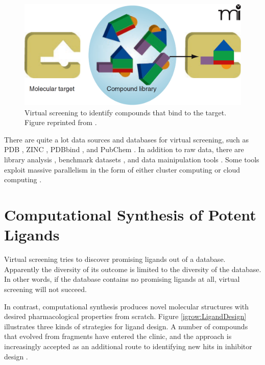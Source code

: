 \begin{figure}
\centering
\includegraphics[width=\textwidth]{Background/VirtualScreening.png}
\caption{Virtual screening to identify compounds that bind to the target. Figure reprinted from \citep{470}.}
\label{Background:VirtualScreening}
\end{figure}

There are quite a lot data sources and databases for virtual screening, such as PDB \citep{540,539,537,105,538}, ZINC \citep{532}, PDBbind \citep{529,530}, and PubChem \citep{526}. In addition to raw data, there are library analysis \citep{521}, benchmark datasets \citep{534,533,535,536}, and data mainipulation tools \citep{542}. Some tools exploit massive parallelism in the form of either cluster computing or cloud computing \citep{557,773,560,782}.

\section{Computational Synthesis of Potent Ligands}

Virtual screening tries to discover promising ligands out of a database. Apparently the diversity of its outcome is limited to the diversity of the database. In other words, if the database contains no promising ligands at all, virtual screening will not succeed.

In contrast, computational synthesis produces novel molecular structures with desired pharmacological properties from scratch. Figure \ref{igrow:LigandDesign} \citep{363} illustrates three kinds of strategies for ligand design. A number of compounds that evolved from fragments have entered the clinic, and the approach is increasingly accepted as an additional route to identifying new hits in inhibitor design \citep{363,470}.

